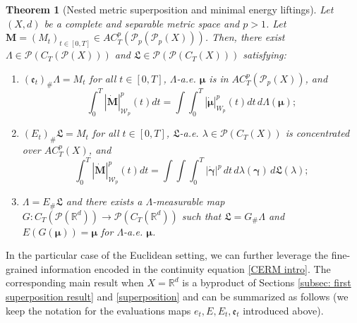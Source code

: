 \documentclass[10pt,leqno]{amsart}
\numberwithin{equation}{section}
\newtheorem{teorema}{Theorem}[section]
\newcommand{\R}{\mathbb{R}}
\newcommand{\PP}{\mathcal{P}}
\begin{document}
\begin{teorema}[Nested metric superposition and minimal energy liftings]\label{metric superposition}
    Let $(X,d)$ be a complete and separable metric space and $p>1$. Let $\boldsymbol{M}=(M_t)_{t\in[0,T]} \in AC_T^p(\PP_p(\PP_p(X)))$.
    Then, there exist $\Lambda \in \PP(C_T(\PP(X)))$ and $\mathfrak{L}\in \PP(\PP(C_T(X)))$ satisfying:
    \begin{enumerate}
        \item[(1)] $(\mathfrak{e}_t)_\#\Lambda = M_t$ for all $t\in [0,T]$, 
        $\Lambda$-a.e. $\boldsymbol{\mu}$ is in $AC_T^p(\PP_p(X))$, and 
        \begin{equation}
            \int_0^T |\dot{\boldsymbol{M}}|_{\mathcal{W}_p}^p(t) dt = \int \int_0^T |\dot{\boldsymbol{\mu}}|_{W_p}^p(t) dt\, d\Lambda(\boldsymbol{\mu});
        \end{equation}
        \item[(2)] $(E_t)_\#\mathfrak{L} = M_t$ for all $t\in [0,T]$,  $\mathfrak{L}$-a.e. $\lambda \in \PP(C_T(X))$ is concentrated over $AC_T^p(X)$, and 
        \begin{equation}
            \int_0^T |\dot{\boldsymbol{M}}|_{\mathcal{W}_p}^p(t) dt = \int \int \int_0^T |\dot{\boldsymbol{\gamma}}|^p \,dt
        \,d\lambda(\boldsymbol{\gamma}) \,d\mathfrak{L}(\lambda);
        \end{equation}
        \item[(3)] $\Lambda = E_\#\mathfrak{L}$ and there exists a $\Lambda$-measurable map $G:C_T(\PP(\R^d)) \to \PP(C_T(\R^d))$ such that $\mathfrak{L}= G_\# \Lambda$ and $E(G(\boldsymbol{\mu})) = \boldsymbol{\mu}$ for $\Lambda$-a.e. $\boldsymbol{\mu}$.
    \end{enumerate}
\end{teorema}
 
In the particular case of the Euclidean setting,
we can further leverage the fine-grained information encoded in the continuity equation
\eqref{CERM intro}.
The corresponding main result
when $X=\R^d$ 
is a byproduct of Sections \ref{subsec: first superposition result} and \ref{superposition}
and can be summarized as follows
(we keep the notation for the 
evaluations maps $e_t,E,E_t,\mathfrak e_t$ introduced above).
\end{document}
